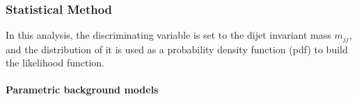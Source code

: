 %
\subsubsection{Statistical Method} 

In this analysis, the discriminating variable is set to the dijet invariant mass $m_{jj}$, and the distribution of it is used as  a probability density function (pdf) to build the likelihood function.

\paragraph{Parametric background models}\mbox{}\par




